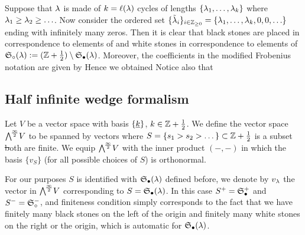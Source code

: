 \documentclass[10pt]{beamer}
\begin{document}
\begin{frame}

Suppose that $\lambda$ is made of $k=\ell(\lambda)$ cycles of lengths $\{\lambda_1,\ldots,\lambda_k\}$ where $\lambda_1\geq\lambda_2\geq\ldots$. Now consider the ordered set $\{\tilde {\lambda}_i\}_{i\in\mathbb Z_{\geq0}}=\{\lambda_1,\ldots,\lambda_k,0,0,\ldots\}$ ending with infinitely many zeros. Then it is clear that black stones are placed in correspondence to elements of 
and white stones in correspondence to elements of $\mathfrak S_\circ(\lambda):=(\mathbb Z+\frac12)\setminus\mathfrak S_\bullet(\lambda)$. Moreover, the coefficients in the modified Frobenius notation are given by
Hence we obtained
Notice also that

\end{frame}

\subsection{Half infinite wedge formalism}

\begin{frame}

\begin{definition}

Let $V$ be a vector space with basis $\{\underline{k}\}$, $k\in\mathbb Z+\frac12$. We define the vector space $\bigwedge^{\!\frac\infty2}\!V$ to be spanned by vectors
where $S=\{s_1>s_2>\dots\}\subset\mathbb Z+\frac12$ is a subset \st both
are finite. We equip $\bigwedge^{\!\frac\infty2}\!V$ with the inner product $(-,-)$ in which the basis $\{v_S\}$ (for all possible choices of $S$) is orthonormal. 

\end{definition}

For our purposes $S$ is identified with $\mathfrak S_\bullet(\lambda)$ defined before, we denote by $v_\lambda$ the vector in $\bigwedge^{\!\frac\infty2}\!V$ corresponding to $S=\mathfrak S_\bullet(\lambda)$. In this case $S^+=\mathfrak S_\bullet^+$ and $S^-=\mathfrak S_\circ^-$, and finiteness condition simply corresponds to the fact that we have finitely many black stones on the left of the origin and finitely many white stones on the right or the origin, which is automatic for $\mathfrak S_\bullet(\lambda)$. 

\end{frame}
\end{document}
